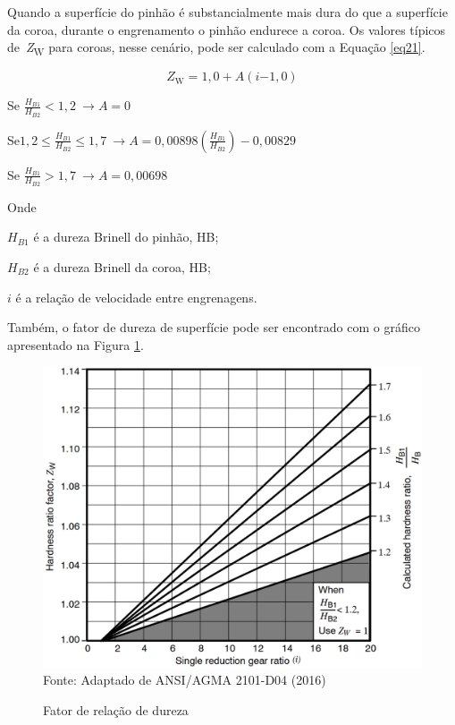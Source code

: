 \documentclass[12pt,a4paper]{article}
\begin{document}
Quando a superfície do pinhão é substancialmente mais dura do que a
superfície da coroa, durante o engrenamento o pinhão endurece a coroa.
Os valores típicos de~\emph{Z}\textsubscript{W} para coroas, nesse
cenário, pode ser calculado com a Equação {\ref{eq21}}.

\par\null

\begin{equation}
\label{eq21}
Z_{\mathrm{W}}\mathrm{=1,0+}A\left(i\mathrm{-}\mathrm{1,0}\right)
\end{equation}

\par\null

Se \(\frac{H_{B1}}{H_{B2}}<1,2\ \rightarrow A=0\)

Se\(1,2\leq\frac{H_{B1}}{H_{B2}}\leq 1,7\ \rightarrow A=0,00898\left(\frac{H_{B1}}{H_{B2}}\right)-0,00829\)

Se \(\frac{H_{B1}}{H_{B2}}>1,7\ \rightarrow A=0,00698\)

Onde

\(H_{B1}\) é a dureza Brinell do pinhão, HB;

\(H_{B2}\) é a dureza Brinell da coroa, HB;

\(i\) é a relação de velocidade entre engrenagens.

Também, o fator de dureza de superfície pode ser encontrado com o
gráfico apresentado na Figura {\ref{fig:17}}.

\begin{figure}[!htb]
    \centering
    \caption{Fator de relação de dureza}
    \includegraphics[scale=0.5]{Imagens/Img17.png}\\
    {\footnotesize Fonte: Adaptado de ANSI/AGMA 2101-D04 (2016)}
    \label{fig:17}
\end{figure}
\end{document}

